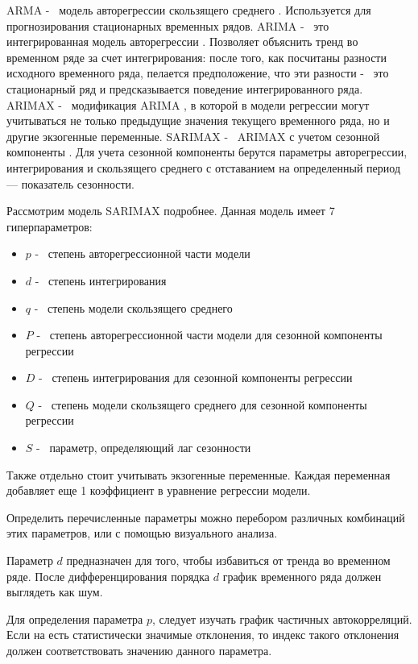 ARMA -~ модель авторегрессии скользящего среднего \cite{torres2005forecast}. Используется для прогнозирования
стационарных временных рядов.
ARIMA -~ это интегрированная модель авторегрессии \cite{contreras2003arima}. Позволяет объяснить тренд во временном
ряде за счет интегрирования: после того, как посчитаны разности исходного временного ряда,
пелается предположение, что эти разности -~ это стационарный ряд и предсказывается поведение
интегрированного ряда.
ARIMAX -~ модификация ARIMA \cite{peter2012arima}, в которой в модели регрессии могут учитываться не только предыдущие значения
текущего временного ряда, но и другие экзогенные переменные.
SARIMAX -~ ARIMAX с учетом сезонной компоненты \cite{omenzetter2005seasonal}. Для учета сезонной компоненты
берутся параметры авторегрессии, интегрирования и скользящего среднего с отставанием
на определенный период --- показатель сезонности.

Рассмотрим модель SARIMAX подробнее. Данная модель имеет 7 гиперпараметров:
\begin{itemize}
	\item $ p $ -~ степень авторегрессионной части модели
	\item $ d $ -~ степень интегрирования
	\item $ q $ -~ степень модели скользящего среднего
	\item $ P $ -~ степень авторегрессионной части модели для сезонной компоненты регрессии
	\item $ D $ -~ степень интегрирования для сезонной компоненты регрессии
	\item $ Q $ -~ степень модели скользящего среднего для сезонной компоненты регрессии
	\item $ S $ -~ параметр, определяющий лаг сезонности
\end{itemize}

Также отдельно стоит учитывать экзогенные переменные. Каждая переменная добавляет еще 1 коэффициент
в уравнение регрессии модели.

Определить перечисленные параметры можно перебором различных комбинаций этих параметров,
или с помощью визуального анализа.

Параметр $ d $ предназначен для того, чтобы избавиться от тренда во временном
ряде. После дифференцирования порядка $ d $ график временного ряда должен выглядеть как шум.

Для определения параметра $ p $, следует изучать график частичных автокорреляций.
Если на есть статистически значимые отклонения, то индекс такого отклонения должен соответствовать
значению данного параметра.

